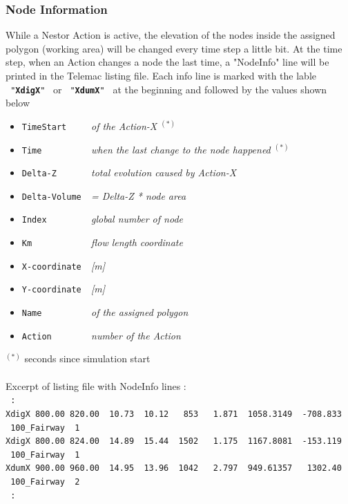 \subsubsection{Node Information} \label{sssec:E1NodeInfo} \label{txt:E1XdigX}
While a Nestor Action is active, the elevation of the nodes inside the assigned polygon (working area)
will be changed every time step a little bit.
At the time step, when an Action changes a node the last time, a "NodeInfo" line will be printed in the Telemac listing file.
Each info line is marked with the lable \texttt{~"\textbf{XdigX}"~} or \texttt{~"\textbf{XdumX}"~} at the beginning and followed by the values shown below
\begin{itemize}
   \item{\texttt{TimeStart~~~~~}\textit{of the Action-X \qquad[s]$^{(*)}$}}
   \item{\texttt{Time~~~~~~~~~~}\textit{when the last change to the node happened \qquad[s]$^{(*)}$ }}
   \item{\texttt{Delta-Z~~~~~~~}\textit{total evolution caused by Action-X \qquad[m]}}
   \item{\texttt{Delta-Volume~~}\textit{= Delta-Z * node area \qquad[m$^3$]}}
   \item{\texttt{Index~~~~~~~~~}\textit{global number of node}}
   \item{\texttt{Km~~~~~~~~~~~~}\textit{flow length coordinate \qquad[km]}}
   \item{\texttt{X-coordinate~~}\textit{[m]}}
   \item{\texttt{Y-coordinate~~}\textit{[m]}}
   \item{\texttt{Name~~~~~~~~~~}\textit{of the assigned polygon}}
   \item{\texttt{Action~~~~~~~~}\textit{number of the Action}}
\end{itemize}
$^{(*)}$ \small{seconds since simulation start}\\
\\
Excerpt of listing file with NodeInfo lines :
\\ \hspace*{3mm} \texttt{\scriptsize{~:}}
\\ \hspace*{3mm} \texttt{\scriptsize{XdigX~800.00~820.00~~10.73~~10.12~~~853~~~1.871~~1058.3149~~-708.833~~~100\_Fairway~~1}}
\\ \hspace*{3mm} \texttt{\scriptsize{XdigX~800.00~824.00~~14.89~~15.44~~1502~~~1.175~~1167.8081~~-153.119~~~100\_Fairway~~1}}
\\ \hspace*{3mm} \texttt{\scriptsize{XdumX~900.00~960.00~~14.95~~13.96~~1042~~~2.797~~949.61357~~~1302.40~~~100\_Fairway~~2}}
\\ \hspace*{3mm} \texttt{\scriptsize{~:}}\\
\\
\newpage
